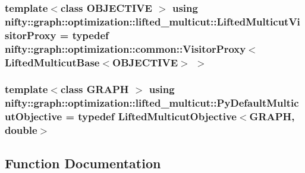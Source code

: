 \subsubsection[{Lifted\+Multicut\+Visitor\+Proxy}]{\setlength{\rightskip}{0pt plus 5cm}template$<$class O\+B\+J\+E\+C\+T\+I\+V\+E $>$ using {\bf nifty\+::graph\+::optimization\+::lifted\+\_\+multicut\+::\+Lifted\+Multicut\+Visitor\+Proxy} = typedef {\bf nifty\+::graph\+::optimization\+::common\+::\+Visitor\+Proxy}$<$ {\bf Lifted\+Multicut\+Base}$<$O\+B\+J\+E\+C\+T\+I\+V\+E$>$ $>$}\label{namespacenifty_1_1graph_1_1optimization_1_1lifted__multicut_a9dd0bd3a8572b292340fd5914c7ce0f4}
\hypertarget{namespacenifty_1_1graph_1_1optimization_1_1lifted__multicut_a462aa786d8b2342b9d580f19f184f5eb}{}
\subsubsection[{Py\+Default\+Multicut\+Objective}]{\setlength{\rightskip}{0pt plus 5cm}template$<$class G\+R\+A\+P\+H $>$ using {\bf nifty\+::graph\+::optimization\+::lifted\+\_\+multicut\+::\+Py\+Default\+Multicut\+Objective} = typedef {\bf Lifted\+Multicut\+Objective}$<$G\+R\+A\+P\+H, double$>$}\label{namespacenifty_1_1graph_1_1optimization_1_1lifted__multicut_a462aa786d8b2342b9d580f19f184f5eb}


\subsection{Function Documentation}
\hypertarget{namespacenifty_1_1graph_1_1optimization_1_1lifted__multicut_a1295e6511368a32684e70efd7bcff118}{}
